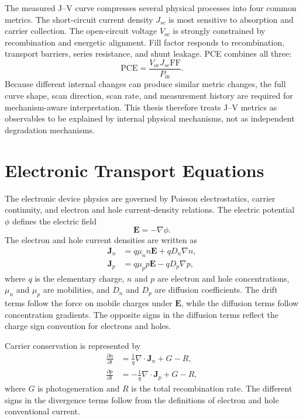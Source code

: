 The measured J--V curve compresses several physical processes into four common
metrics. The short-circuit current density $J_{sc}$ is most sensitive to
absorption and carrier collection. The open-circuit voltage $V_{oc}$ is
strongly constrained by recombination and energetic alignment. Fill factor
responds to recombination, transport barriers, series resistance, and shunt
leakage. PCE combines all three:
\begin{equation}
\mathrm{PCE}=\frac{V_{oc}J_{sc}\mathrm{FF}}{P_{\mathrm{in}}}.
\end{equation}
Because different internal changes can produce similar metric changes, the
full curve shape, scan direction, scan rate, and measurement history are
required for mechanism-aware interpretation. This thesis therefore treats
J--V metrics as observables to be explained by internal physical mechanisms,
not as independent degradation mechanisms.

\section{Electronic Transport Equations}

The electronic device physics are governed by Poisson electrostatics, carrier
continuity, and electron and hole current-density relations. The electric
potential $\phi$ defines the electric field
\begin{equation}
\mathbf{E}=-\nabla \phi .
\end{equation}
The electron and hole current densities are written as
\begin{align}
\mathbf{J}_n &= q\mu_n n\mathbf{E} + qD_n\nabla n,\\
\mathbf{J}_p &= q\mu_p p\mathbf{E} - qD_p\nabla p,
\end{align}
where $q$ is the elementary charge, $n$ and $p$ are electron and hole
concentrations, $\mu_n$ and $\mu_p$ are mobilities, and $D_n$ and $D_p$ are
diffusion coefficients. The drift terms follow the force on mobile charges
under $\mathbf{E}$, while the diffusion terms follow concentration gradients.
The opposite signs in the diffusion terms reflect the charge sign convention
for electrons and holes.

Carrier conservation is represented by
\begin{align}
\frac{\partial n}{\partial t}
&= \frac{1}{q}\nabla\cdot \mathbf{J}_n + G - R,\\
\frac{\partial p}{\partial t}
&= -\frac{1}{q}\nabla\cdot \mathbf{J}_p + G - R,
\end{align}
where $G$ is photogeneration and $R$ is the total recombination rate. The
different signs in the divergence terms follow from the definitions of
electron and hole conventional current.

